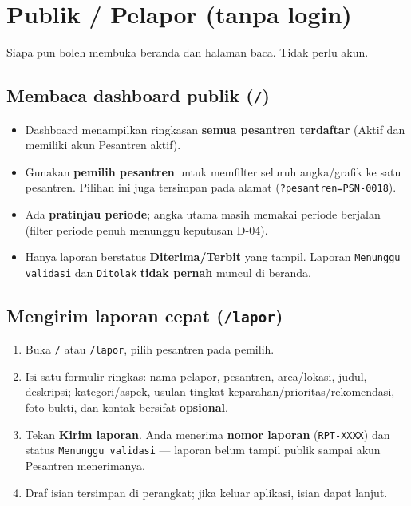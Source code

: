 \documentclass[11pt,a4paper]{article}
\newcommand{\code}[1]{\texttt{#1}}
\begin{document}
\section{Publik / Pelapor (tanpa login)}

Siapa pun boleh membuka beranda dan halaman baca. Tidak perlu akun.

\subsection{Membaca dashboard publik (\code{/})}
\begin{itemize}
  \item Dashboard menampilkan ringkasan \textbf{semua pesantren terdaftar}
        (Aktif dan memiliki akun Pesantren aktif).
  \item Gunakan \textbf{pemilih pesantren} untuk memfilter seluruh angka/grafik ke
        satu pesantren. Pilihan ini juga tersimpan pada alamat
        (\code{?pesantren=PSN-0018}).
  \item Ada \textbf{pratinjau periode}; angka utama masih memakai periode berjalan
        (filter periode penuh menunggu keputusan D-04).
  \item Hanya laporan berstatus \textbf{Diterima/Terbit} yang tampil. Laporan
        \code{Menunggu validasi} dan \code{Ditolak} \textbf{tidak pernah} muncul di
        beranda.
\end{itemize}

\subsection{Mengirim laporan cepat (\code{/lapor})}
\begin{enumerate}
  \item Buka \code{/} atau \code{/lapor}, pilih pesantren pada pemilih.
  \item Isi satu formulir ringkas: nama pelapor, pesantren, area/lokasi, judul,
        deskripsi; kategori/aspek, usulan tingkat keparahan/prioritas/rekomendasi,
        foto bukti, dan kontak bersifat \textbf{opsional}.
  \item Tekan \textbf{Kirim laporan}. Anda menerima \textbf{nomor laporan}
        (\code{RPT-XXXX}) dan status \code{Menunggu validasi} --- laporan belum
        tampil publik sampai akun Pesantren menerimanya.
  \item Draf isian tersimpan di perangkat; jika keluar aplikasi, isian dapat lanjut.
\end{enumerate}
\end{document}
